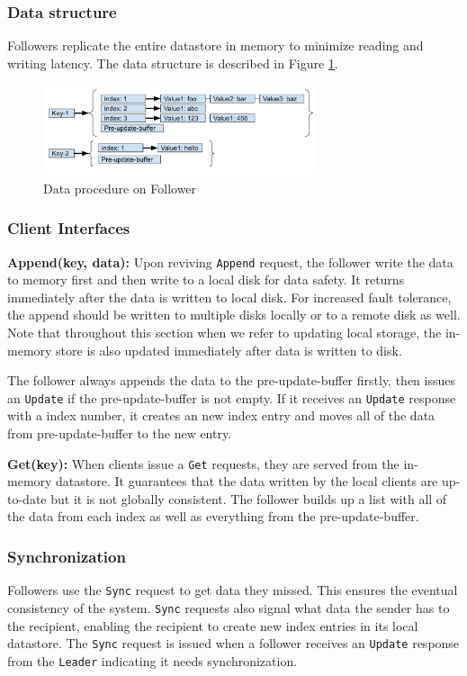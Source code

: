 \documentclass[11pt,english,twocolumn]{article}
\begin{document}
\subsubsection{Data structure}
Followers replicate the entire datastore in memory to minimize
reading and writing latency. The data structure is described in Figure \ref{DataStructure}.

\begin{figure}[h]
\includegraphics[width=8cm]{figure/DataStructure.pdf}
\caption{Data procedure on Follower}
\label{DataStructure}
\end{figure}

\subsubsection{Client Interfaces}
\textbf{Append(key, data):} Upon reviving \texttt{Append} request, the follower write the data to memory first and then write to a local disk for data safety. It returns immediately after the data is written to local disk. For increased fault
tolerance, the append should be written to multiple disks locally or to a remote
disk as well. Note that throughout this section when we refer to updating local
storage, the in-memory store is also updated immediately after data is written
to disk.

The follower always appends the data to the pre-update-buffer firstly, then issues an \texttt{Update} if the pre-update-buffer is not empty. If it receives an \texttt{Update} response with a index number, it creates an new index entry and moves all of the data from pre-update-buffer to the new entry. 

\noindent \textbf{Get(key):} When clients issue a \texttt{Get} requests, they are served from the in-memory datastore. It guarantees that the data written by the local clients are up-to-date but it is not globally consistent. The follower builds up a list with all of the data from each index as well as everything from the pre-update-buffer.

\subsubsection{Synchronization}
Followers use the \texttt{Sync} request to get data they missed. This ensures the eventual consistency of the system. \texttt{Sync} requests also signal what data the sender has to the recipient, enabling the recipient to create new index entries in its local datastore. The \texttt{Sync} request is issued when a follower receives an \texttt{Update} response from the \texttt{Leader} indicating it needs synchronization. 
\end{document}
